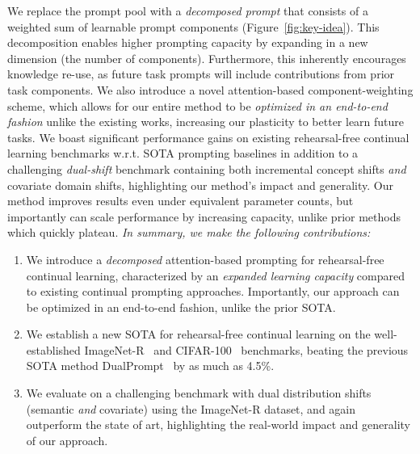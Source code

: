 We replace the prompt pool with a \emph{decomposed prompt} that consists of a weighted sum of learnable prompt components (Figure~\ref{fig:key-idea}). This decomposition enables higher prompting capacity by expanding in a new dimension (the number of components). Furthermore, this inherently encourages knowledge re-use, as future task prompts will include contributions from prior task components. We also introduce a novel attention-based component-weighting scheme, which allows for our entire method to be \emph{optimized in an end-to-end fashion} unlike the existing works, increasing our plasticity to better learn future tasks. 
We boast significant performance gains on existing rehearsal-free continual learning benchmarks w.r.t. SOTA prompting baselines in addition to a challenging \emph{dual-shift} benchmark containing both incremental concept shifts \emph{and} covariate domain shifts, highlighting our method's impact and generality. Our method improves results even under equivalent parameter counts, but importantly can scale performance by increasing capacity, unlike prior methods which quickly plateau. 
\emph{In summary, we make the following contributions:}
\begin{enumerate}
    \item We introduce a \emph{decomposed} attention-based prompting for rehearsal-free continual learning, characterized by an \emph{expanded learning capacity} compared to existing continual prompting approaches. Importantly, our approach can be optimized in an end-to-end fashion, unlike the prior SOTA.
    \item We establish a new SOTA for rehearsal-free continual learning on the well-established ImageNet-R~\cite{hendrycks2021many,wang2022dualprompt} and CIFAR-100~\cite{krizhevsky2009learning} benchmarks, beating the previous SOTA method DualPrompt~\cite{wang2022dualprompt} by as much as 4.5\%.
    \item We evaluate on a challenging benchmark with dual distribution shifts (semantic \emph{and} covariate) using the ImageNet-R dataset, and again outperform the state of art, highlighting the real-world impact and generality of our approach.
\end{enumerate}
